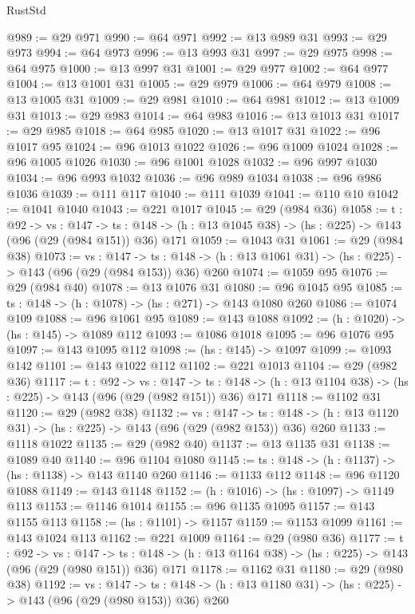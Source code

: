 \begin{lexlean}{RustStd}
\begin{coremodule}
{\begin{coremodule}
{{{{{@989 := @29 @971
@990 := @64 @971
@992 := @13 @989 @31
@993 := @29 @973
@994 := @64 @973
@996 := @13 @993 @31
@997 := @29 @975
@998 := @64 @975
@1000 := @13 @997 @31
@1001 := @29 @977
@1002 := @64 @977
@1004 := @13 @1001 @31
@1005 := @29 @979
@1006 := @64 @979
@1008 := @13 @1005 @31
@1009 := @29 @981
@1010 := @64 @981
@1012 := @13 @1009 @31
@1013 := @29 @983
@1014 := @64 @983
@1016 := @13 @1013 @31
@1017 := @29 @985
@1018 := @64 @985
@1020 := @13 @1017 @31
@1022 := @96 @1017 @95
@1024 := @96 @1013 @1022
@1026 := @96 @1009 @1024
@1028 := @96 @1005 @1026
@1030 := @96 @1001 @1028
@1032 := @96 @997 @1030
@1034 := @96 @993 @1032
@1036 := @96 @989 @1034
@1038 := @96 @986 @1036
@1039 := @111 @117
@1040 := @111 @1039
@1041 := @110 @10
@1042 := @1041 @1040
@1043 := @221 @1017
@1045 := @29 (@984 @36)
@1058 := {t : @92} ->
  {vs : @147} ->
  {ts : @148} -> (h : @13 @1045 @38) -> (hs : @225) -> @143 (@96 (@29 (@984 @151)) @36) @171
@1059 := @1043 @31
@1061 := @29 (@984 @38)
@1073 := {vs : @147} ->
  {ts : @148} -> (h : @13 @1061 @31) -> (hs : @225) -> @143 (@96 (@29 (@984 @153)) @36) @260
@1074 := @1059 @95
@1076 := @29 (@984 @40)
@1078 := @13 @1076 @31
@1080 := @96 @1045 @95
@1085 := {ts : @148} -> (h : @1078) -> (hs : @271) -> @143 @1080 @260
@1086 := @1074 @109
@1088 := @96 @1061 @95
@1089 := @143 @1088
@1092 := (h : @1020) -> (hs : @145) -> @1089 @112
@1093 := @1086 @1018
@1095 := @96 @1076 @95
@1097 := @143 @1095 @112
@1098 := (hs : @145) -> @1097
@1099 := @1093 @142
@1101 := @143 @1022 @112
@1102 := @221 @1013
@1104 := @29 (@982 @36)
@1117 := {t : @92} ->
  {vs : @147} ->
  {ts : @148} -> (h : @13 @1104 @38) -> (hs : @225) -> @143 (@96 (@29 (@982 @151)) @36) @171
@1118 := @1102 @31
@1120 := @29 (@982 @38)
@1132 := {vs : @147} ->
  {ts : @148} -> (h : @13 @1120 @31) -> (hs : @225) -> @143 (@96 (@29 (@982 @153)) @36) @260
@1133 := @1118 @1022
@1135 := @29 (@982 @40)
@1137 := @13 @1135 @31
@1138 := @1089 @40
@1140 := @96 @1104 @1080
@1145 := {ts : @148} -> (h : @1137) -> (hs : @1138) -> @143 @1140 @260
@1146 := @1133 @112
@1148 := @96 @1120 @1088
@1149 := @143 @1148
@1152 := (h : @1016) -> (hs : @1097) -> @1149 @113
@1153 := @1146 @1014
@1155 := @96 @1135 @1095
@1157 := @143 @1155 @113
@1158 := (hs : @1101) -> @1157
@1159 := @1153 @1099
@1161 := @143 @1024 @113
@1162 := @221 @1009
@1164 := @29 (@980 @36)
@1177 := {t : @92} ->
  {vs : @147} ->
  {ts : @148} -> (h : @13 @1164 @38) -> (hs : @225) -> @143 (@96 (@29 (@980 @151)) @36) @171
@1178 := @1162 @31
@1180 := @29 (@980 @38)
@1192 := {vs : @147} ->
  {ts : @148} -> (h : @13 @1180 @31) -> (hs : @225) -> @143 (@96 (@29 (@980 @153)) @36) @260
}}}}}
\end{coremodule}}
\end{coremodule}
\end{lexlean}
